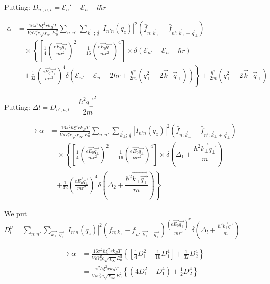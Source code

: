 \documentclass{article}
\begin{document}
Putting: $D_{n';n,l} = \mathcal{E}_n'-\mathcal{E}_n - l\hbar r$

\begin{align*}
\alpha &= \frac{16 \pi^2 \hbar \xi^2 r k_B T}{V \rho V_s^2 c \sqrt{\chi_\infty} E_0^2} \sum_{n,n'} \sum_{\vec{k}_\bot; \vec{q}} |I_{n'n}(q_z)|^2 (\bar{f}_{n; \vec{k}_\bot} - \bar{f}_{n'; \vec{k}_\bot + \vec{q}_\bot}) \\
&\quad \times \left\{ \left[ \frac{1}{4}  \left( \frac{e \vec{E_0} \vec{q_\bot}}{m r^2} \right)^2  - \frac{1}{16} \left( \frac{e \vec{E_0} \vec{q_\bot}}{m r^2} \right)^4 \right] \times \delta \left( \mathcal{E}_{n'} - \mathcal{E}_n - \hbar r \right) \right. \\
&\quad \left. + \frac{1}{32} \left( \frac{e \vec{E_0} \vec{q_\bot}}{m r^2} \right)^4 \delta \left( \mathcal{E}_{n'} - \mathcal{E}_n - 2\hbar r + \frac{\hbar^2}{2m} (q_\bot^2 + 2\vec{k}_\bot \vec{q}_\bot) \right) \right\} + \frac{\hbar^2}{2m} (q_\bot^2 + 2\vec{k}_\bot \vec{q}_\bot)
\end{align*}

Putting: $\Delta l = D_{n';n;l}+\dfrac{\hbar^2 \vec{q_\bot}^2}{2m}$

\begin{align*}
 \to \alpha &= \frac{16 \pi^2 \hbar \xi^2 r k_B T}{V \rho V_s^2 c \sqrt{\chi_\infty} E_0^2} \sum_{n;n'} \sum_{\vec{k}_\bot; \vec{q}} |I_{n'n}(q_z)|^2 (\bar{f}_{n; \vec{k}_\bot} - \bar{f}_{n'; \vec{k}_\bot + \vec{q}_\bot}) \\
&\quad \times \left\{ \left[ \frac{1}{4}  \left( \frac{e \vec{E_0} \vec{q_\bot}}{m r^2} \right)^2   - \frac{1}{16}  \left( \frac{e \vec{E_0} \vec{q_\bot}}{m r^2} \right)^4 \right] \times \delta \left(\Delta_1 + \dfrac{\hbar^2 \vec{k_\bot} \vec{q_\bot}}{m} \right) \right. \\
&\quad \left. + \frac{1}{32}\left( \frac{e \vec{E_0} \vec{q_\bot}}{m r^2} \right)^4 \delta \left(\Delta_2 + \dfrac{\hbar^2 \vec{k_\bot \vec{q_\bot}}}{m} \right)  \right\} 
\end{align*}

We put $D_l^\nu = \sum_{n;n'} \sum_{\vec{k_\bot}; \vec{q_\bot}} |I_{n'n}(q_z)|^2 (f_{n; k_\bot} - f_{n'; \vec{k_\bot}+\vec{q_\bot}})  \frac{(e \vec{E_0} \vec{q_\bot})^\nu}{m r^2}  \delta(\Delta_l + \frac{\hbar^2 \vec{k_\bot} \vec{q_\bot}}{m})$

\begin{align*}
    \rightarrow \alpha &= \frac{16 \pi^2 \hbar \xi^2 r k_B T}{V \rho V_s^2 c \sqrt{\chi_\infty} E_0^2 } \left\{ \left[ \frac{1}{4} D_1^2 - \frac{1}{16} D_1^4 \right] + \frac{1}{32} D_2^4 \right\} \\
    &= \frac{\pi^2 \hbar \xi^2 r k_B T}{V \rho v_s^2 c \sqrt{\chi_\infty} E_0^2} \left\{ (4 D_1^2 - D_1^4) + \frac{1}{2} D_2^4 \right\}
\end{align*}
\end{document}
